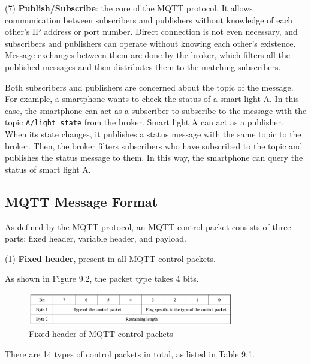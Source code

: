 \documentclass[a4paper,12pt,openany]{book}
\begin{document}
(7) \textbf{Publish/Subscribe}: the core of the MQTT protocol. It allows communication between subscribers and publishers without knowledge of each other’s IP address or port number. Direct connection is not even necessary, and subscribers and publishers can operate without knowing each other's existence. Message exchanges between them are done by the broker, which filters all the published messages and then distributes them to the matching subscribers.

Both subscribers and publishers are concerned about the topic of the message. For example, a smartphone wants to check the status of a smart light A. In this case, the smartphone can act as a subscriber to subscribe to the message with the topic \verb|A/light_state| from the broker. Smart light A can act as a publisher. When its state changes, it publishes a status message with the same topic to the broker. Then, the broker filters subscribers who have subscribed to the topic and publishes the status message to them. In this way, the smartphone can query the status of smart light A.

\subsection{MQTT Message Format}
As defined by the MQTT protocol, an MQTT control packet consists of three parts: fixed header, variable header, and payload.

(1) \textbf{Fixed header}, present in all MQTT control packets.

As shown in Figure 9.2, the packet type takes 4 bits.

\begin{figure}[!h]
    \centering
    \includegraphics[width=0.8\textwidth]{D9Z/9-2}
    \caption{Fixed header of MQTT control packets}
\end{figure}

There are 14 types of control packets in total, as listed in Table 9.1.
\end{document}
